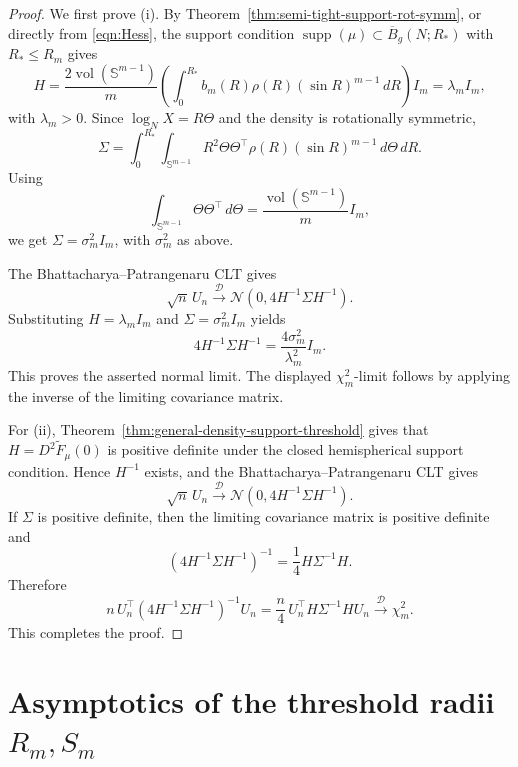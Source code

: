 \documentclass{amsart}
\theoremstyle{definition}
\theoremstyle{remark}
\newcommand\0{\boldsymbol{0}}
\begin{document}
\begin{proof}
We first prove \textup{(i)}. By Theorem~\ref{thm:semi-tight-support-rot-symm}, or directly from \eqref{eqn:Hess}, the support condition \(\operatorname{supp}(\mu)\subset\overline B_g(N;R_*)\) with \(R_*\le R_m\) gives
\[
    H
    =
    \frac{2\operatorname{vol}(\mathbb S^{m-1})}{m}
    \left(
    \int_0^{R_*}
    b_m(R)\rho(R)(\sin R)^{m-1}\,dR
    \right)I_m
    =
    \lambda_m I_m,
\]
with \(\lambda_m>0\). Since \(\log_N X=R\Theta\) and the density is rotationally symmetric,
\[
    \Sigma
    =
    \int_0^{R_*}\int_{\mathbb S^{m-1}}
    R^2\Theta\Theta^\top
    \rho(R)(\sin R)^{m-1}\,d\Theta\,dR .
\]
Using
\[
    \int_{\mathbb S^{m-1}}\Theta\Theta^\top\,d\Theta
    =
    \frac{\operatorname{vol}(\mathbb S^{m-1})}{m}I_m,
\]
we get \(\Sigma=\sigma_m^2I_m\), with \(\sigma_m^2\) as above.

The Bhattacharya--Patrangenaru CLT gives
\[
    \sqrt n\,U_n
    \xrightarrow{\mathcal D}
    \mathcal N(0,4H^{-1}\Sigma H^{-1}).
\]
Substituting \(H=\lambda_m I_m\) and \(\Sigma=\sigma_m^2I_m\) yields
\[
    4H^{-1}\Sigma H^{-1}
    =
    \frac{4\sigma_m^2}{\lambda_m^2}I_m.
\]
This proves the asserted normal limit. The displayed \(\chi_m^2\)-limit follows by applying the inverse of the limiting covariance matrix.

For \textup{(ii)}, Theorem~\ref{thm:general-density-support-threshold} gives that \(H=D^2\widetilde F_\mu(0)\) is positive definite under the closed hemispherical support condition. Hence \(H^{-1}\) exists, and the Bhattacharya--Patrangenaru CLT gives
\[
    \sqrt n\,U_n
    \xrightarrow{\mathcal D}
    \mathcal N(0,4H^{-1}\Sigma H^{-1}).
\]
If \(\Sigma\) is positive definite, then the limiting covariance matrix is positive definite and
\[
    \left(4H^{-1}\Sigma H^{-1}\right)^{-1}
    =
    \frac14 H\Sigma^{-1}H.
\]
Therefore
\[
    n\,U_n^\top
    \left(4H^{-1}\Sigma H^{-1}\right)^{-1}
    U_n
    =
    \frac n4\,U_n^\top H\Sigma^{-1}HU_n
    \xrightarrow{\mathcal D}
    \chi_m^2 .
\]
This completes the proof.
\end{proof}







\section{Asymptotics of the threshold radii $R_m, S_m$}
\label{app:asymptotics-Rm-Sm}
\end{document}
